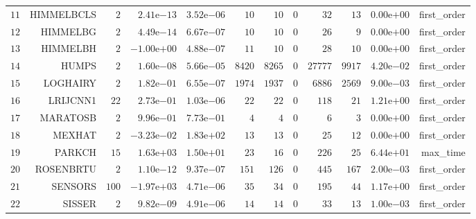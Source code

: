 \begin{longtable}{rrrrrrrrrrrr}
  \(    11\) & HIMMELBCLS & \(     2\) & \( 2.41\)e\(-13\) & \( 3.52\)e\(-06\) & \(    10\) & \(    10\) & \(     0\) & \(    32\) & \(    13\) & \( 0.00\)e\(+00\) & first\_order \\
  \(    12\) & HIMMELBG & \(     2\) & \( 4.49\)e\(-14\) & \( 6.67\)e\(-07\) & \(    10\) & \(    10\) & \(     0\) & \(    26\) & \(     9\) & \( 0.00\)e\(+00\) & first\_order \\
  \(    13\) & HIMMELBH & \(     2\) & \(-1.00\)e\(+00\) & \( 4.88\)e\(-07\) & \(    11\) & \(    10\) & \(     0\) & \(    28\) & \(    10\) & \( 0.00\)e\(+00\) & first\_order \\
  \(    14\) & HUMPS & \(     2\) & \( 1.60\)e\(-08\) & \( 5.66\)e\(-05\) & \(  8420\) & \(  8265\) & \(     0\) & \( 27777\) & \(  9917\) & \( 4.20\)e\(-02\) & first\_order \\
  \(    15\) & LOGHAIRY & \(     2\) & \( 1.82\)e\(-01\) & \( 6.55\)e\(-07\) & \(  1974\) & \(  1937\) & \(     0\) & \(  6886\) & \(  2569\) & \( 9.00\)e\(-03\) & first\_order \\
  \(    16\) & LRIJCNN1 & \(    22\) & \( 2.73\)e\(-01\) & \( 1.03\)e\(-06\) & \(    22\) & \(    22\) & \(     0\) & \(   118\) & \(    21\) & \( 1.21\)e\(+00\) & first\_order \\
  \(    17\) & MARATOSB & \(     2\) & \( 9.96\)e\(-01\) & \( 7.73\)e\(-01\) & \(     4\) & \(     4\) & \(     0\) & \(     6\) & \(     3\) & \( 0.00\)e\(+00\) & first\_order \\
  \(    18\) & MEXHAT & \(     2\) & \(-3.23\)e\(-02\) & \( 1.83\)e\(+02\) & \(    13\) & \(    13\) & \(     0\) & \(    25\) & \(    12\) & \( 0.00\)e\(+00\) & first\_order \\
  \(    19\) & PARKCH & \(    15\) & \( 1.63\)e\(+03\) & \( 1.50\)e\(+01\) & \(    23\) & \(    16\) & \(     0\) & \(   226\) & \(    25\) & \( 6.44\)e\(+01\) & max\_time \\
  \(    20\) & ROSENBRTU & \(     2\) & \( 1.10\)e\(-12\) & \( 9.37\)e\(-07\) & \(   151\) & \(   126\) & \(     0\) & \(   445\) & \(   167\) & \( 2.00\)e\(-03\) & first\_order \\
  \(    21\) & SENSORS & \(   100\) & \(-1.97\)e\(+03\) & \( 4.71\)e\(-06\) & \(    35\) & \(    34\) & \(     0\) & \(   195\) & \(    44\) & \( 1.17\)e\(+00\) & first\_order \\
  \(    22\) & SISSER & \(     2\) & \( 9.82\)e\(-09\) & \( 4.91\)e\(-06\) & \(    14\) & \(    14\) & \(     0\) & \(    33\) & \(    13\) & \( 1.00\)e\(-03\) & first\_order \\

\end{longtable}
